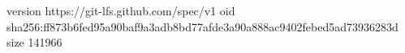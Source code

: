 version https://git-lfs.github.com/spec/v1
oid sha256:ff873b6fed95a90baf9a3adb8bd77afde3a90a888ac9402febed5ad73936283d
size 141966
